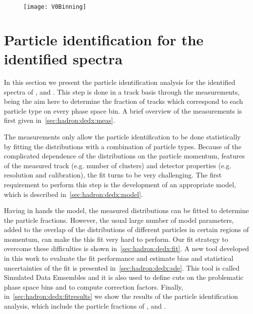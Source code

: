 \begin{figure}[!ht]
  \centering
  \texttt{[image: V0Binning]}
  \caption{}
  \label{fig:hadron:binning:vzero}
\end{figure}


\section{Particle identification for the identified spectra}


In this section we present the particle identification
analysis for the identified spectra of \pions, \kaons and \protons.
This step is done in a track basis through the \dedx measurements,
being the aim here to determine the fraction of tracks which
correspond to each particle type on every phase space bin.
A brief overview of the \dedx measurements is first given
in~\cref{sec:hadron:dedx:meas}.

The \dedx measurements only allow the particle identification
to be done statistically by fitting
the \dedx distributions with a combination of particle
types. Because of the complicated dependence of the \dedx
distributions on the particle momentum,
features of the measured track (e.g. number of clusters) and
detector properties (e.g. resolution and calibration),
the \dedx fit turns to be very challenging. The first
requirement to perform this step is the development
of an appropriate \dedx model,
which is described in~\cref{sec:hadron:dedx:model}.

Having in hands the \dedx model, the measured \dedx
distributions can be fitted to determine the particle
fractions. However, the usual large number of
model parameters, added to the
overlap of the \dedx distributions
of different particles in certain regions of momentum,
can make the this fit very hard to perform.
Our fit strategy to overcome these difficulties is shown
in~\cref{sec:hadron:dedx:fit}. A new tool
developed in this work to evaluate the fit performance
and estimate bias and statistical uncertainties of the fit
is presented in~\cref{sec:hadron:dedx:sde}. This
tool is called Simulated Data Emsembles and
it is also used to define cuts on the problematic
phase space bins and to compute correction factors.
Finally, in~\cref{sec:hadron:dedx:fitresults} we show the results
of the particle identification analysis, which include
the particle fractions of \pions, \kaons and \protons.


